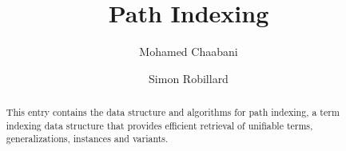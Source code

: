 \documentclass[11pt,a4paper]{article}
\begin{document}
\title{Path Indexing}
\author{Mohamed Chaabani \and Simon Robillard}
\maketitle

\begin{abstract}
  This entry contains the data structure and algorithms for path indexing, a term indexing data structure that provides efficient retrieval of unifiable terms, generalizations, instances and variants.
\end{abstract}

\tableofcontents





\end{document}
